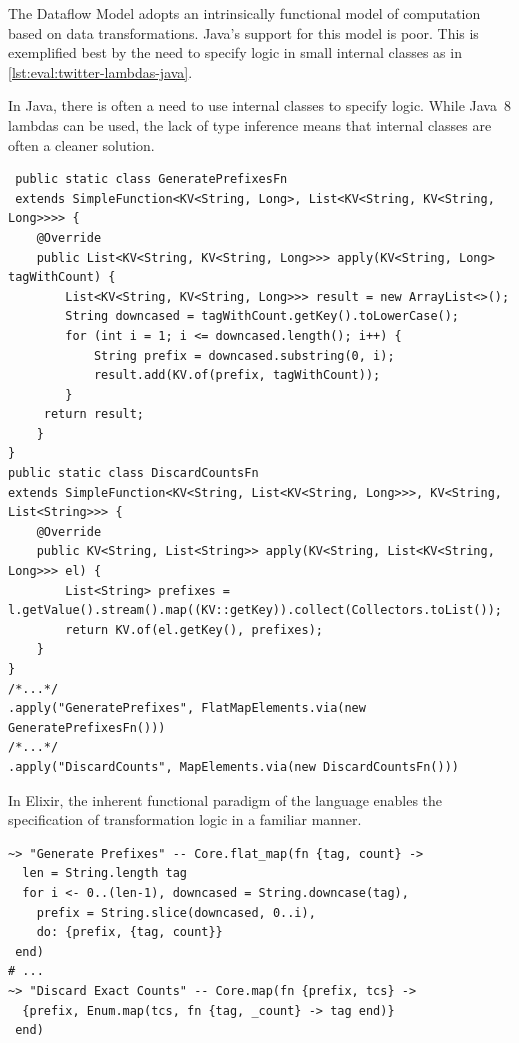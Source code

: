 The Dataflow Model adopts an intrinsically functional model of computation based on data transformations.
Java's support for this model is poor.
This is exemplified best by the need to specify logic in small internal classes as in \cref{lst:eval:twitter-lambdas-java}.

\begin{codelisting}
	\caption[Using internal classes to specify transformation logic in Java.]{In Java, there is often a need to use internal classes to specify logic. While Java~8 lambdas can be used, the lack of type inference means that internal classes are often a cleaner solution.}
	\label{lst:eval:twitter-lambdas-java}
	\begin{verbatim}
 public static class GeneratePrefixesFn
 extends SimpleFunction<KV<String, Long>, List<KV<String, KV<String, Long>>>> {
    @Override
    public List<KV<String, KV<String, Long>>> apply(KV<String, Long> tagWithCount) {
        List<KV<String, KV<String, Long>>> result = new ArrayList<>();
        String downcased = tagWithCount.getKey().toLowerCase();
        for (int i = 1; i <= downcased.length(); i++) {
            String prefix = downcased.substring(0, i);
            result.add(KV.of(prefix, tagWithCount));
        }
     return result;
    }
}
public static class DiscardCountsFn
extends SimpleFunction<KV<String, List<KV<String, Long>>>, KV<String, List<String>>> {
    @Override
    public KV<String, List<String>> apply(KV<String, List<KV<String, Long>>> el) {
        List<String> prefixes = l.getValue().stream().map((KV::getKey)).collect(Collectors.toList());
        return KV.of(el.getKey(), prefixes);
    }
}
/*...*/
.apply("GeneratePrefixes", FlatMapElements.via(new GeneratePrefixesFn()))
/*...*/
.apply("DiscardCounts", MapElements.via(new DiscardCountsFn()))
	\end{verbatim}
\end{codelisting}

\begin{codelisting}
	\caption[Using lambdas to specify transformation logic in Elixir.]{In Elixir, the inherent functional paradigm of the language enables the specification of transformation logic in a familiar manner.}
	\label{lst:eval:twitter-lambdas-elixir}
	\begin{verbatim}
~> "Generate Prefixes" -- Core.flat_map(fn {tag, count} ->
  len = String.length tag
  for i <- 0..(len-1), downcased = String.downcase(tag),
    prefix = String.slice(downcased, 0..i),
    do: {prefix, {tag, count}}
 end)
# ...
~> "Discard Exact Counts" -- Core.map(fn {prefix, tcs} ->
  {prefix, Enum.map(tcs, fn {tag, _count} -> tag end)}
 end)
	\end{verbatim}
\end{codelisting}

